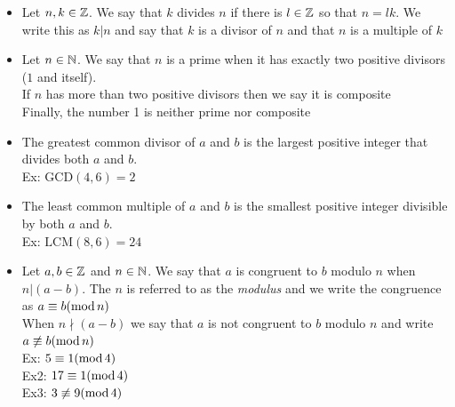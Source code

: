 \documentclass[11pt, fleqn]{article}
\begin{document}
\begin{itemize}
    \item Let $n,k\in\mathbb{Z}$. We say that $k$ divides $n$ if there is $l\in\mathbb{Z}$ so that $n=lk$. We write this as $k|n$ and say that $k$ is a divisor of $n$ and that $n$ is a multiple of $k$
    \item Let $n\in\mathbb{N}$. We say that $n$ is a prime when it has exactly two positive divisors ($1$ and itself).\\
    If $n$ has more than two positive divisors then we say it is composite\\
    Finally, the number 1 is neither prime nor composite
    \item The greatest common divisor of $a$ and $b$ is the largest positive integer that divides both $a$ and $b$.\\
    Ex: $\mathrm{GCD}(4,6)=2$
    \item The least common multiple of $a$ and $b$ is the smallest positive integer divisible by both $a$ and $b$.\\
    Ex: $\mathrm{LCM}(8,6)=24$
    \item Let $a,b\in\mathbb{Z}$ and $n\in\mathbb{N}$. We say that $a$ is congruent to $b$ modulo $n$ when $n|(a-b)$. The $n$ is referred to as the \textit{modulus} and we write the congruence as $a\equiv b(\operatorname{mod} n)$\\
    When $n\nmid (a-b)$ we say that $a$ is not congruent to $b$ modulo $n$ and write $a\not\equiv b(\operatorname{mod} n)$\\
    Ex: $5\equiv 1(\operatorname{mod}4)$\\
    Ex2: $17\equiv1(\operatorname{mod}4)$\\
    Ex3: $3\not\equiv9(\operatorname{mod}4)$
\end{itemize}
\end{document}
